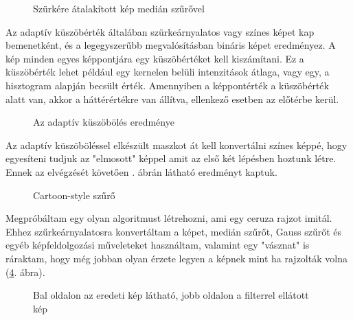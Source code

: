 \begin{figure}[ht]
\centering
{}
\caption{Szürkére átalakított kép medián szűrővel} 
\label{fig:cartoon3}
\end{figure}

\newpage


Az adaptív küszöbérték általában szürkeárnyalatos vagy színes képet kap bemenetként, és a legegyszerűbb megvalósításban bináris képet eredményez. A kép minden egyes képpontjára egy küszöbértéket kell kiszámítani. Ez a küszöbérték lehet például egy kernelen belüli intenzitások átlaga, vagy egy, a hisztogram alapján becsült érték. Amennyiben a képpontérték a küszöbérték alatt van, akkor a háttérértékre van állítva, ellenkező esetben az előtérbe kerül.

\begin{figure}[ht]
\centering
{}
\caption{Az adaptív küszöbölés eredménye} 
\label{fig:cartoon4}
\end{figure}


Az adaptív küszöböléssel elkészült maszkot át kell konvertálni színes képpé, hogy egyesíteni tudjuk az "elmosott" képpel amit az első két lépésben hoztunk létre. Ennek az elvégzését követően . ábrán látható eredményt kaptuk.

\begin{figure}[ht]
\centering
{}
\caption{Cartoon-style szűrő } 
\label{fig:cartoon5}
\end{figure}




Megpróbáltam egy olyan algoritmust létrehozni, ami egy ceruza rajzot imitál. Ehhez szűrkeárnyalatosra konvertáltam a képet, medián szűrőt, Gauss szűrőt és egyéb képfeldolgozási műveleteket használtam, valamint egy "vásznat" is ráraktam, hogy még jobban olyan érzete legyen a képnek mint ha rajzolták volna (\ref{fig:pencil1}. ábra).

\begin{figure}[ht]
\centering
{}
\caption{Bal oldalon az eredeti kép látható, jobb oldalon a filterrel ellátott kép} 
\label{fig:pencil1}
\end{figure}

